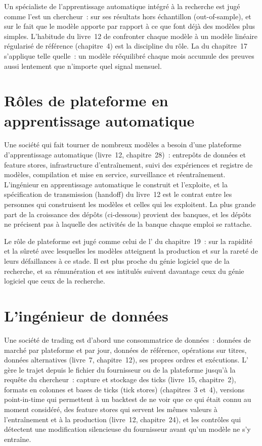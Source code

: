 Un spécialiste de l'apprentissage automatique intégré à la recherche est jugé comme l'est un chercheur~: sur ses résultats hors échantillon (out-of-sample), et sur le fait que le
modèle apporte par rapport à ce que font déjà des modèles plus simples. L'habitude du livre~12 de confronter chaque modèle à un modèle linéaire régularisé
de référence (chapitre~4) est la discipline du rôle. La  du chapitre~17 s'applique telle quelle~: un modèle rééquilibré chaque mois
accumule des preuves aussi lentement que n'importe quel signal mensuel.

\section{Rôles de plateforme en apprentissage automatique}

Une société qui fait tourner de nombreux modèles a besoin d'une plateforme d'apprentissage automatique (livre~12, chapitre~28)~: entrepôts de données et feature stores, infrastructure d'entraînement,
suivi des expériences et registre de modèles, compilation et mise en service, surveillance et réentraînement. L'ingénieur en
apprentissage automatique le construit et l'exploite, et la spécification de transmission (handoff) du livre~12 est le contrat entre les
personnes qui construisent les modèles et celles qui les exploitent. La plus grande part de la croissance des dépôts (ci-dessous) provient des banques, et les
dépôts ne précisent pas à laquelle des activités de la banque chaque emploi se rattache.

Le rôle de plateforme est jugé comme celui de l' du chapitre~19~: sur la rapidité et la sûreté avec lesquelles les modèles atteignent
la production et sur la rareté de leurs défaillances à ce stade. Il est plus proche du génie logiciel que de la recherche, et sa rémunération et ses
intitulés suivent davantage ceux du génie logiciel que ceux de la recherche.

\section{L'ingénieur de données}

Une société de trading est d'abord une consommatrice de données~: données de marché par plateforme et par jour, données de référence,
opérations sur titres, données alternatives (livre~7, chapitre~12), ses propres ordres et exécutions. L' gère le trajet depuis
le fichier du fournisseur ou de la plateforme jusqu'à la requête du chercheur~: capture et stockage des ticks (livre~15, chapitre~2), formats en colonnes
et bases de ticks (tick stores) (chapitres~3 et~4), versions point-in-time qui permettent à un backtest de ne voir que ce qui était connu
au moment considéré, des feature stores qui servent les mêmes valeurs à l'entraînement et à la production (livre~12, chapitre~24), et les contrôles qui
détectent une modification silencieuse du fournisseur avant qu'un modèle ne s'y entraîne.

